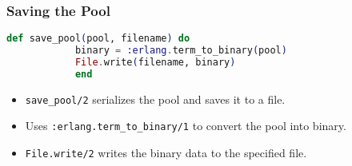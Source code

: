 \documentclass[aspectratio=169, table]{beamer}
\begin{document}
	
	\frame{\titlepage}
	
	\begin{frame}
		\frametitle{Saving the Pool}
		\begin{lstlisting}[language=Elixir]
			def save_pool(pool, filename) do
			binary = :erlang.term_to_binary(pool)
			File.write(filename, binary)
			end
		\end{lstlisting}
		\begin{itemize}
			\item \texttt{save\_pool/2} serializes the pool and saves it to a file.
			\item Uses \texttt{:erlang.term\_to\_binary/1} to convert the pool into binary.
			\item \texttt{File.write/2} writes the binary data to the specified file.
		\end{itemize}
	\end{frame}
	
\end{document}

